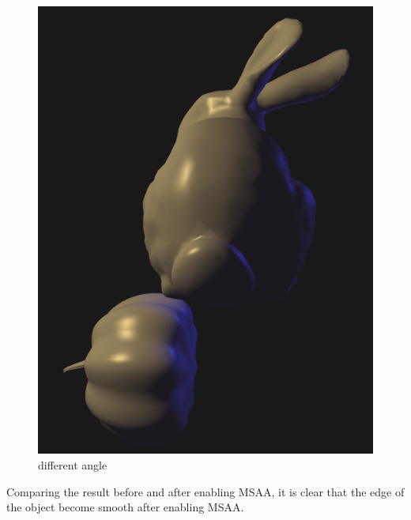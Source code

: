 \documentclass[acmtog]{acmart}
\begin{document}
\begin{figure}[h]
{\begin{minipage}[b]{.4\linewidth}
		\includegraphics[scale=0.25]{right.png}
	\end{minipage}
}
\caption{different angle}
\end{figure}


Comparing the result before and after enabling MSAA, it is clear that the edge of the object become smooth after enabling MSAA.
\end{document}

